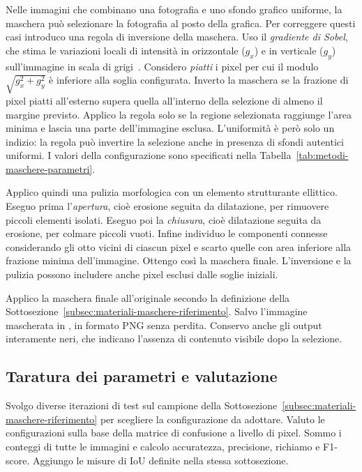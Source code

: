 Nelle immagini che combinano una fotografia e uno sfondo grafico uniforme, la maschera può selezionare la fotografia al posto della grafica. Per correggere questi casi introduco una regola di inversione della maschera. Uso il \emph{gradiente di Sobel}, che stima le variazioni locali di intensità in orizzontale ($g_x$) e in verticale ($g_y$) sull'immagine in scala di grigi~\cite{996}. Considero \emph{piatti} i pixel per cui il modulo $\sqrt{g_x^2+g_y^2}$ è inferiore alla soglia configurata. Inverto la maschera se la frazione di pixel piatti all'esterno supera quella all'interno della selezione di almeno il margine previsto. Applico la regola solo se la regione selezionata raggiunge l'area minima e lascia una parte dell'immagine esclusa. L'uniformità è però solo un indizio: la regola può invertire la selezione anche in presenza di sfondi autentici uniformi. I valori della configurazione sono specificati nella Tabella~\ref{tab:metodi-maschere-parametri}.

Applico quindi una pulizia morfologica con un elemento strutturante ellittico. Eseguo prima l'\emph{apertura}, cioè erosione seguita da dilatazione, per rimuovere piccoli elementi isolati. Eseguo poi la \emph{chiusura}, cioè dilatazione seguita da erosione, per colmare piccoli vuoti. Infine individuo le componenti connesse considerando gli otto vicini di ciascun pixel e scarto quelle con area inferiore alla frazione minima dell'immagine. Ottengo così la maschera finale. L'inversione e la pulizia possono includere anche pixel esclusi dalle soglie iniziali.

Applico la maschera finale all'originale secondo la definizione della Sottosezione~\ref{subsec:materiali-maschere-riferimento}. Salvo l'immagine mascherata in , in formato PNG senza perdita. Conservo anche gli output interamente neri, che indicano l'assenza di contenuto visibile dopo la selezione.

\subsection{Taratura dei parametri e valutazione}
\label{subsec:metodi-maschere-taratura}

Svolgo diverse iterazioni di test sul campione della Sottosezione~\ref{subsec:materiali-maschere-riferimento} per scegliere la configurazione da adottare. Valuto le configurazioni sulla base della matrice di confusione a livello di pixel. Sommo i conteggi di tutte le immagini e calcolo accuratezza, precisione, richiamo e F1-score. Aggiungo le misure di IoU definite nella stessa sottosezione.

